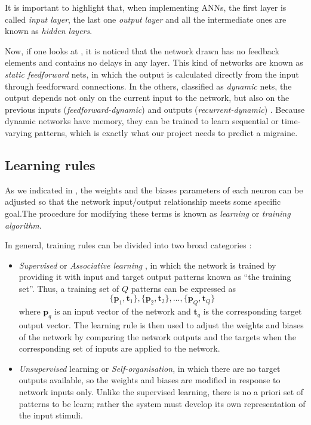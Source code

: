 It is important to highlight that, when implementing ANNs, the first layer is called \emph{input layer}, the last one \emph{output layer} and all the intermediate ones are known as \emph{hidden layers}. 

Now, if one looks at , it is noticed that the network drawn has no feedback elements and contains no delays in any layer. This kind of networks are known as \emph{static feedforward} nets, in which the output is calculated
directly from the input through feedforward connections. 
In the others, classified as \emph{dynamic} nets,
the output depends not only on the current input to the network, but also on the previous inputs (\emph{feedforward-dynamic}) and  outputs (\emph{recurrent-dynamic}) \cite{dimith3neural}.
Because dynamic networks have memory, they can be trained to learn sequential or time-varying patterns, which is exactly what our project needs to predict a migraine. 







\subsection{Learning rules}
\label{subsec:learningrules}

As we indicated in , the weights and the biases parameters of each neuron can be adjusted so that the network input/output relationship meets some specific goal.The procedure for modifying these terms is known as \emph{learning} or \emph{training algorithm}. 

In general, training rules can be divided into two broad categories \cite{demuth2008neural}:
\begin{itemize}
\item \emph{Supervised} or \emph{Associative learning}
, in which the network is trained by providing it with input and target output patterns known as ``the training set''. Thus, a training set of $Q$ patterns can be expressed as
\begin{equation}
\{\mathbf{p}_1,\mathbf{t}_1\},\{\mathbf{p}_2,\mathbf{t}_2\}, ... , \{\mathbf{p}_Q,\mathbf{t}_Q\}
\end{equation}
where $\mathbf{p}_q$ is an input vector of the network and $\mathbf{t}_q$ is the corresponding target output vector.
The learning rule is then used to adjust the weights and biases of the network by comparing the network outputs and the targets when the corresponding set of inputs are applied to the network.
\item \emph{Unsupervised} learning or \emph{Self-organisation}, in which there are no target outputs available, so the weights and biases are modified in response to network inputs only. 
Unlike the supervised learning, there is no a priori set of patterns to be learn;
rather the system must develop its own representation of the input stimuli.
\end{itemize}

